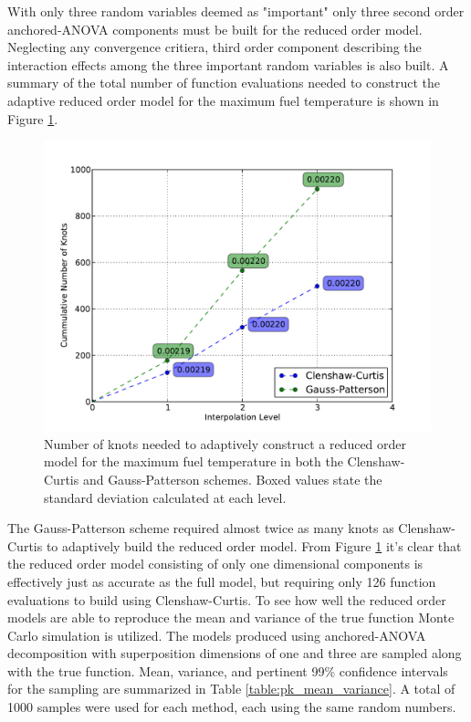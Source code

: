 With only three random variables deemed as "important" only three second order anchored-\ac{ANOVA} components must be built for the reduced order model. Neglecting any convergence critiera, third order component describing the interaction effects among the three important random variables is also built. A summary of the total number of function evaluations needed to construct the adaptive reduced order model for the maximum fuel temperature is shown in Figure \ref{fig:pk_sparse_grid_numknots}.          
\begin{figure}[!htb]
\caption{\label{fig:pk_sparse_grid_numknots}
Number of knots needed to adaptively construct a reduced order model for the maximum fuel temperature in both the Clenshaw-Curtis and Gauss-Patterson schemes. Boxed values state the standard deviation calculated at each level.  
}
 \begin{center}
  \includegraphics[scale=.75]{./Chapter3/pk_sparse_grid_numknots.pdf}
 \end{center}
\end{figure}
The Gauss-Patterson scheme required almost twice as many knots as Clenshaw-Curtis to adaptively build the reduced order model. From Figure \ref{fig:pk_sparse_grid_numknots} it's clear that the reduced order model consisting of only one dimensional components is effectively just as accurate as the full model, but requiring only 126 function evaluations to build using Clenshaw-Curtis. To see how well the reduced order models are able to reproduce the mean and variance of the true function Monte Carlo simulation is utilized. The models produced using anchored-\ac{ANOVA} decomposition with superposition dimensions of one and three are sampled along with the true function. Mean, variance, and pertinent 99\% confidence intervals for the sampling are summarized in Table \ref{table:pk_mean_variance}. A total of 1000 samples were used for each method, each using the same random numbers.      
